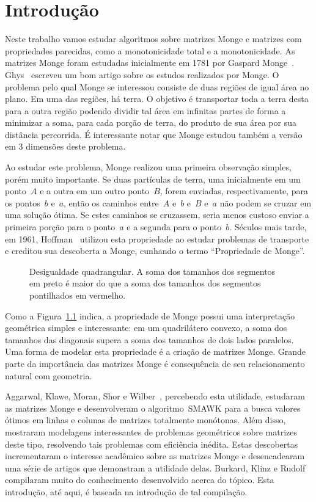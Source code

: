 \chapter{Introdução}
\label{Introducao}

Neste trabalho vamos estudar algoritmos sobre matrizes Monge e matrizes com propriedades parecidas, como a monotonicidade total e a monotonicidade. As matrizes Monge foram estudadas inicialmente em 1781 por Gaspard Monge~\cite{Monge:1781}. Ghys~\cite{Ghys:2012} escreveu um bom artigo sobre os estudos realizados por Monge. O problema pelo qual Monge se interessou consiste de duas regiões de igual área no plano. Em uma das regiões, há terra. O objetivo é transportar toda a terra desta para a outra região podendo dividir tal área em infinitas partes de forma a minimizar a soma, para cada porção de terra, do produto de sua área por sua distância percorrida. É interessante notar que Monge estudou também a versão em 3 dimensões deste problema.

Ao estudar este problema, Monge realizou uma primeira observação simples, porém muito importante. Se duas partículas de terra, uma inicialmente em um ponto~$A$ e a outra em um outro ponto~$B$, forem enviadas, respectivamente, para os pontos~$b$ e~$a$, então os caminhos entre~$A$ e~$b$ e~$B$ e~$a$ não podem se cruzar em uma solução ótima. Se estes caminhos se cruzassem, seria menos custoso enviar a primeira porção para o ponto~$a$ e a segunda para o ponto~$b$. Séculos mais tarde, em 1961, Hoffman~\cite{Hoffman:2003} utilizou esta propriedade ao estudar problemas de transporte e creditou sua descoberta a Monge, cunhando o termo ``Propriedade de Monge''.

\begin{figure}[h]
    \centering
    
    \caption{Desigualdade quadrangular. A soma dos tamanhos dos segmentos em preto é maior do que a soma dos tamanhos dos segmentos pontilhados em vermelho.} \label{Introducao:QI}
\end{figure}

Como a Figura~\ref{Introducao:QI} indica, a propriedade de Monge possui uma interpretação geométrica simples e interessante: em um quadrilátero convexo, a soma dos tamanhos das diagonais supera a soma dos tamanhos de dois lados paralelos. Uma forma de modelar esta propriedade é a criação de matrizes Monge. Grande parte da importância das matrizes Monge é consequência de seu relacionamento natural com geometria. 

Aggarwal, Klawe, Moran, Shor e Wilber~\cite{Aggarwal:1987}, percebendo esta utilidade, estudaram as matrizes Monge e desenvolveram o algoritmo~\textsc{SMAWK} para a busca valores ótimos em linhas e colunas de matrizes totalmente monótonas. Além disso, mostraram modelagens interessantes de problemas geométricos sobre matrizes deste tipo, resolvendo tais problemas com eficiência inédita. Estas descobertas incrementaram o interesse acadêmico sobre as matrizes Monge e desencadearam uma série de artigos que demonstram a utilidade delas. Burkard, Klinz e Rudolf~\cite{Burkard:1996} compilaram muito do conhecimento desenvolvido acerca do tópico. Esta introdução, até aqui, é baseada na introdução de tal compilação.

